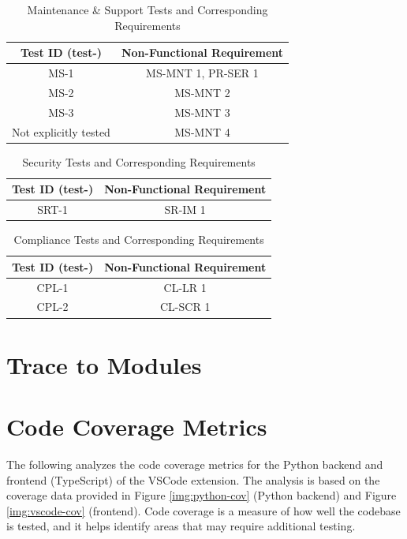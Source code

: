 \documentclass[12pt, titlepage]{article}
\begin{document}
  \begin{table}[H]
    \centering
    \caption{Maintenance \& Support Tests and Corresponding Requirements}
    \begin{tabular}{cc}
      \toprule \textbf{Test ID (test-)} & \textbf{Non-Functional Requirement} \\
      \midrule
      MS-1 & MS-MNT 1, PR-SER 1 \\
      MS-2 & MS-MNT 2 \\
      MS-3 & MS-MNT 3 \\
      Not explicitly tested & MS-MNT 4 \\
      \bottomrule
    \end{tabular}
  \end{table}

\begin{table}[H]
  \centering
  \caption{Security Tests and Corresponding Requirements}
  \begin{tabular}{cc}
    \toprule \textbf{Test ID (test-)} & \textbf{Non-Functional Requirement} \\
    \midrule
    SRT-1 & SR-IM 1 \\
    \bottomrule
  \end{tabular}
\end{table}


  \begin{table}[H]
    \centering
    \caption{Compliance Tests and Corresponding Requirements}
    \begin{tabular}{cc}
      \toprule \textbf{Test ID (test-)} & \textbf{Non-Functional Requirement} \\
      \midrule
      CPL-1 & CL-LR 1 \\
      CPL-2 & CL-SCR 1 \\
      \bottomrule
    \end{tabular}
  \end{table}

\section{Trace to Modules}

\section{Code Coverage Metrics}

The following analyzes the code coverage metrics for the Python
backend and frontend (TypeScript) of the VSCode extension. The
analysis is based on the coverage data provided in Figure
\ref{img:python-cov} (Python backend) and Figure \ref{img:vscode-cov}
(frontend). Code coverage is a measure of how well the codebase is
tested, and it helps identify areas that may require additional testing.
\end{document}
